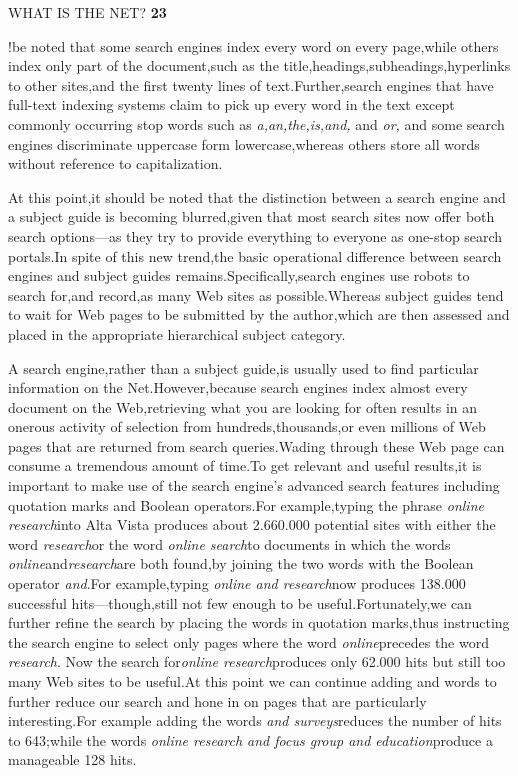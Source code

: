 \documentclass[10pt,a4paper]{book}
\begin{document}
\begin{flushright}
  WHAT IS THE NET? \qquad \textbf{23}
\end{flushright}

!\!\!\!\!\!\!\!\!\!\!be noted that some search engines index every word on every page,while others index only part of the document,such as the title,headings,subheadings,hyperlinks to other sites,and the first twenty lines of text.Further,search engines that have full-text indexing systems claim to pick up every word in the text except commonly occurring stop words such as \emph{a,an,the,is,and,} and \emph{or,} and some search engines discriminate uppercase form lowercase,whereas others store all words without reference to capitalization.

At this point,it should be noted that the distinction between a search engine and a subject guide is becoming blurred,given that most search sites now offer both search options---as they try to provide everything to everyone as one-stop search portals.In spite of this new trend,the basic operational difference between search engines and subject guides remains.Specifically,search engines use robots to search for,and record,as many Web sites as possible.Whereas subject guides tend to wait for Web pages to be submitted by the author,which are then assessed and placed in the appropriate hierarchical subject category.

A search engine,rather than a subject guide,is usually used to find particular information on the Net.However,because search engines index almost every document on the Web,retrieving what you are looking for often results in an onerous activity of selection from hundreds,thousands,or even millions of Web pages that are returned from search queries.Wading through these Web page can consume a tremendous amount of time.To get relevant and useful results,it is important to make use of the search engine's advanced search features including quotation marks and Boolean operators.For example,typing the phrase \emph{online research}into Alta Vista produces about 2.660.000 potential sites with either the word  \emph{research}or the word \emph{online search}to documents in which the words \emph{online}and\emph{research}are both found,by joining the two words with the Boolean operator \emph{and}.For example,typing \emph{online and research}now produces 138.000 successful hits---though,still not few enough to be useful.Fortunately,we can further refine the search by placing the words in quotation marks,thus instructing the search engine to select only pages where the word \emph{online}precedes the word \emph{research}. Now the search for\emph{online research}produces only 62.000 hits but still too many Web sites to be useful.At this point we can continue adding and words to further reduce our search and hone in on pages that are particularly interesting.For example adding the words \emph{and surveys}reduces the number of hits to 643;while the words \emph{online research and focus group and education}produce a manageable 128 hits. 
\end{document}
